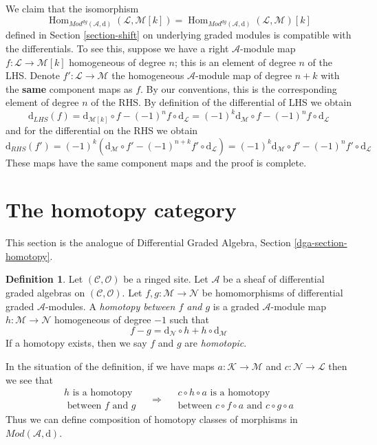 \documentclass{stacks-project}
\theoremstyle{plain}
\theoremstyle{definition}
\newtheorem{definition}[subsection]{Definition}
\theoremstyle{remark}
\numberwithin{equation}{subsection}
\def\Hom{\mathop{\mathrm{Hom}}\nolimits}
\begin{document}
\medskip\noindent
We claim that the isomorphism
$$
\Hom_{\textit{Mod}^{dg}(\mathcal{A}, \text{d})}(\mathcal{L}, \mathcal{M}[k])
=
\Hom_{\textit{Mod}^{dg}(\mathcal{A}, \text{d})}(\mathcal{L}, \mathcal{M})[k]
$$
defined in Section \ref{section-shift} on underlying graded modules
is compatible with
the differentials. To see this, suppose we have a right $\mathcal{A}$-module
map $f : \mathcal{L} \to \mathcal{M}[k]$ homogeneous of degree $n$; this
is an element of degree $n$ of the LHS. Denote
$f' : \mathcal{L} \to \mathcal{M}$ the homogeneous $\mathcal{A}$-module
map of degree $n + k$ with the {\bf same} component maps as $f$.
By our conventions, this is the corresponding element of degree $n$
of the RHS.
By definition of the differential of LHS we obtain
$$
\text{d}_{LHS}(f) =
\text{d}_{\mathcal{M}[k]} \circ f - (-1)^n f \circ \text{d}_\mathcal{L} =
(-1)^k\text{d}_\mathcal{M} \circ f - (-1)^n f \circ \text{d}_\mathcal{L}
$$
and for the differential on the RHS we obtain
$$
\text{d}_{RHS}(f') =
(-1)^k\left(
\text{d}_\mathcal{M} \circ f' - (-1)^{n + k} f' \circ \text{d}_\mathcal{L}
\right) =
(-1)^k\text{d}_\mathcal{M} \circ f' - (-1)^n f' \circ \text{d}_\mathcal{L}
$$
These maps have the same component maps and the proof is complete.










\section{The homotopy category}
\label{section-homotopy}

\noindent
This section is the analogue of
Differential Graded Algebra, Section \ref{dga-section-homotopy}.

\begin{definition}
\label{definition-homotopy}
Let $(\mathcal{C}, \mathcal{O})$ be a ringed site.
Let $\mathcal{A}$ be a sheaf of differential graded algebras
on $(\mathcal{C}, \mathcal{O})$. Let
$f, g : \mathcal{M} \to \mathcal{N}$
be homomorphisms of differential graded $\mathcal{A}$-modules.
A {\it homotopy between $f$ and $g$} is a graded $\mathcal{A}$-module
map $h : \mathcal{M} \to \mathcal{N}$ homogeneous of degree $-1$
such that
$$
f - g = \text{d}_\mathcal{N} \circ h + h \circ \text{d}_\mathcal{M}
$$
If a homotopy exists, then we say $f$ and $g$ are {\it homotopic}.
\end{definition}

\noindent
In the situation of the definition, if we have maps
$a : \mathcal{K} \to \mathcal{M}$ and $c : \mathcal{N} \to \mathcal{L}$
then we see that
$$
\begin{matrix}
h\text{ is a homotopy} \\
\text{ between }f\text{ and } g
\end{matrix}
\quad
\Rightarrow
\quad
\begin{matrix}
c \circ h \circ a\text{ is a homotopy}\\
\text{between }
c \circ f \circ a\text{ and } c\circ g \circ a
\end{matrix}
$$
Thus we can define composition of homotopy classes of morphisms
in $\textit{Mod}(\mathcal{A}, \text{d})$.
\end{document}
